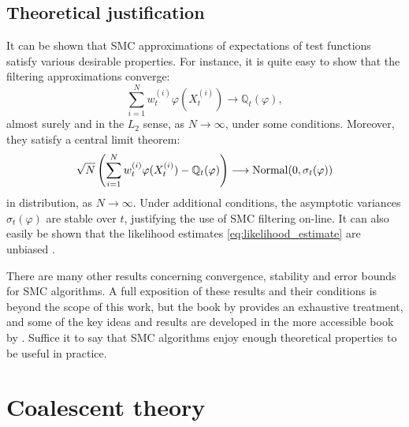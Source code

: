 \subsection{Theoretical justification}
\label{sec:SMC_theory}
It can be shown that SMC approximations of expectations of test functions satisfy various desirable properties. For instance, it is quite easy to show that the filtering approximations converge:
\begin{equation*}
\sum_{i=1}^N w_t^{(i)} \varphi( X_t^{(i)} ) 
\longrightarrow \mathbb{Q}_t(\varphi) ,
\end{equation*}
almost surely and in the $L_2$ sense, as $N\to\infty$, under some conditions.
Moreover, they satisfy a central limit theorem:
\begin{equation*}
\sqrt{N} \left( \sum_{i=1}^N w_t^{(i)} \varphi( X_t^{(i)} ) - \mathbb{Q}_t(\varphi) \right)
\longrightarrow  \operatorname{Normal}( 0, \sigma_t(\varphi) )
\end{equation*}
in distribution, as $N\to\infty$. Under additional conditions, the asymptotic variances $\sigma_t(\varphi)$ are stable over $t$, justifying the use of SMC filtering on-line.
It can also easily be shown that the likelihood estimates \eqref{eq:likelihood_estimate} are unbiased \parencite[see for example][Proposition 16.3]{chopin2020}.

There are many other results concerning convergence, stability and error bounds for SMC algorithms. A full exposition of these results and their conditions is beyond the scope of this work, but the book by \textcite{delmoral2013} provides an exhaustive treatment, and some of the key ideas and results are developed in the more accessible book by \textcite[Chapter 11]{chopin2020}.
Suffice it to say that SMC algorithms enjoy enough theoretical properties to be useful in practice.





\section{Coalescent theory \seb{$\checkmark$} }
\label{sec:coaltheory}

